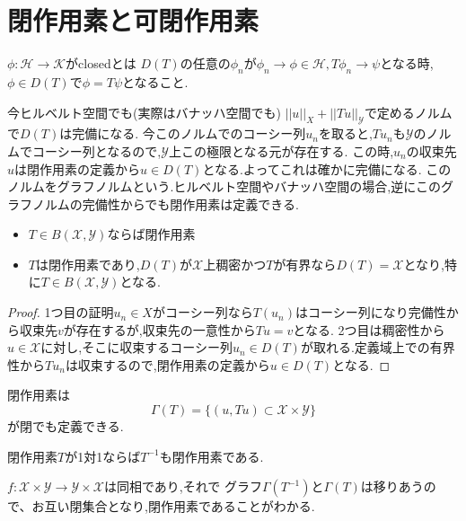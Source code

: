 \documentclass[uplatex]{jsbook}
\begin{document}
\section{閉作用素と可閉作用素}
\begin{screen}
\begin{dfn}
 $\phi: \mathcal{H} \to \mathcal{K}$がclosedとは
 $D(T)$の任意の$\phi_n$が$\phi_n \to \phi \in \mathcal{H}, T\phi_n \to \psi$となる時,$\phi \in D(T)$で$\phi = T\psi$となること.
\end{dfn}
\end{screen}

今ヒルベルト空間でも(実際はバナッハ空間でも)
$||u||_X + ||Tu||_{\mathcal{Y}}$で定めるノルムで$D(T)$は完備になる.
今このノルムでのコーシー列$u_n$を取ると,$Tu_n$も$\mathcal{Y}$のノルムでコーシー列となるので,$\mathcal{Y}$上この極限となる元が存在する.
この時,$u_n$の収束先$u$は閉作用素の定義から$u \in D(T)$となる.よってこれは確かに完備になる.
このノルムをグラフノルムという.ヒルベルト空間やバナッハ空間の場合,逆にこのグラフノルムの完備性からでも閉作用素は定義できる.

\begin{thm}
  \begin{itemize}
    \item $T \in B(\mathcal{X}, \mathcal{Y})$ならば閉作用素
    \item $T$は閉作用素であり,$D(T)$が$\mathcal{X}$上稠密かつ$T$が有界なら$D(T) = \mathcal{X}$となり,特に$T \in B(\mathcal{X}, \mathcal{Y})$となる.
  \end{itemize}
\end{thm}
\begin{proof}
  1つ目の証明$u_n \in X$がコーシー列なら$T(u_n )$はコーシー列になり完備性から収束先$v$が存在するが,収束先の一意性から$Tu = v$となる.
  2つ目は稠密性から$u \in \mathcal{X}$に対し,そこに収束するコーシー列$u_n \in D(T)$が取れる.定義域上での有界性から$Tu_n$は収束するので,閉作用素の定義から$u \in D(T)$となる.
\end{proof}

閉作用素は
\begin{equation*}
 \Gamma(T) = \{(u, Tu) \subset \mathcal{X} \times \mathcal{Y}\}
\end{equation*}
が閉でも定義できる.

\begin{thm}
  閉作用素$T$が1対1ならば$T^{-1}$も閉作用素である.
\end{thm}
$f:\mathcal{X}\times \mathcal{Y} \to \mathcal{Y} \times \mathcal{X}$は同相であり,それで
グラフ$\Gamma(T^{-1})$と$\Gamma(T)$は移りあうので、お互い閉集合となり,閉作用素であることがわかる.
\end{document}
